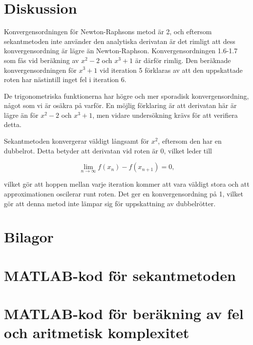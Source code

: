 \documentclass[a4paper,titlepage]{article}
\begin{document}
\section{Diskussion}

Konvergensordningen för Newton-Raphsons metod är 2, och eftersom sekantmetoden
inte använder den analytiska derivatan är det rimligt att dess konvergensordning är lägre
än Newton-Raphson. Konvergensordningen 1.6-1.7 som fås vid beräkning av $x^2-2$ och
$x^3 + 1$ är därför rimlig. Den beräknade konvergensordningen för $x^3 + 1$ vid
iteration 5 förklaras av att den uppskattade roten har nästintill inget fel i
iteration 6.

De trigonometriska funktionerna har högre och mer sporadisk konvergensordning,
något som vi är osäkra på varför. En möjlig förklaring är att derivatan här är
lägre än för $x^2-2$ och $x^3 + 1$, men vidare undersökning krävs för att
verifiera detta.

Sekantmetoden konvergerar väldigt långsamt för $x^2$, eftersom den har en
dubbelrot. Detta betyder att derivatan vid roten är 0, vilket leder till

\[
    \lim_{n \to \infty} f(x_n) - f(x_{n+1}) = 0,
\]

vilket gör att hoppen mellan varje iteration kommer att vara väldigt stora och att
approximationen oscilerar runt roten. Det ger en konvergensordning på
1, vilket gör att denna metod inte lämpar sig för uppskattning av dubbelrötter.

\section*{Bilagor}
\appendix

\section{MATLAB-kod för sekantmetoden}


\section{MATLAB-kod för beräkning av fel och aritmetisk komplexitet}
\label{sec:testcode}


\end{document}
